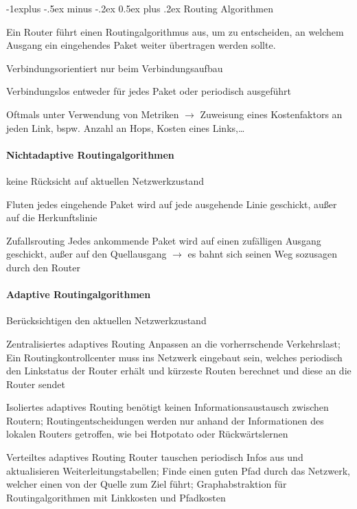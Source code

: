 \documentclass[a4paper]{article}
\makeatletter
\renewcommand{\subsection}{\@startsection{subsection}{2}{0mm}%
                                {-1explus -.5ex minus -.2ex}%
                                {0.5ex plus .2ex}%
                                {\normalfont\normalsize\bfseries}}
\makeatother
\begin{document}
\begin{multicols}{3}
    \subsection{Routing Algorithmen}
    \begin{itemize*}
        \item Ein Router führt einen Routingalgorithmus aus, um zu entscheiden, an welchem Ausgang ein eingehendes Paket weiter übertragen werden sollte.
        \begin{description*}
            \item[Verbindungsorientiert] nur beim Verbindungsaufbau
            \item[Verbindungslos] entweder für jedes Paket oder periodisch ausgeführt
        \end{description*}
        \item Oftmals unter Verwendung von Metriken $\rightarrow$ Zuweisung eines Kostenfaktors an jeden Link, bspw. Anzahl an Hops, Kosten eines Links,…
    \end{itemize*}
    \paragraph{Nichtadaptive Routingalgorithmen}
    \begin{description*}
        \item[] keine Rücksicht auf aktuellen Netzwerkzustand
        \item[Fluten] jedes eingehende Paket wird auf jede ausgehende Linie geschickt, außer auf die Herkunftslinie
        \item[Zufallsrouting] Jedes ankommende Paket wird auf einen zufälligen Ausgang geschickt, außer auf den Quellausgang $\rightarrow$ es bahnt sich seinen Weg sozusagen durch den Router
    \end{description*}
    \paragraph{Adaptive Routingalgorithmen}
    \begin{description*}
        \item[] Berücksichtigen den aktuellen Netzwerkzustand
        \item[Zentralisiertes adaptives Routing] Anpassen an die vorherrschende Verkehrslast; Ein Routingkontrollcenter muss ins Netzwerk eingebaut sein, welches periodisch den Linkstatus der Router erhält und kürzeste Routen berechnet und diese an die Router sendet
        \item[Isoliertes adaptives Routing] benötigt keinen Informationsaustausch zwischen Routern; Routingentscheidungen werden nur anhand der Informationen des lokalen Routers getroffen, wie bei Hotpotato oder Rückwärtslernen
        \item[Verteiltes adaptives Routing] Router tauschen periodisch Infos aus und aktualisieren Weiterleitungstabellen; Finde einen guten Pfad durch das Netzwerk, welcher einen von der Quelle zum Ziel führt; Graphabstraktion für Routingalgorithmen mit Linkkosten und Pfadkosten
    \end{description*}
    

\end{multicols}
\end{document}
